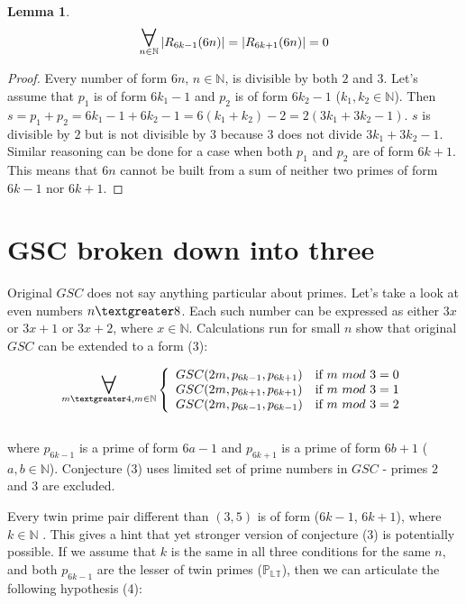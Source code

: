 \documentclass[10pt,twocolumn]{article}
\newtheorem{lemma}[theorem]{Lemma}
\newcommand\bigforall{\mbox{\huge $\mathsurround0pt\forall$}}
\begin{document}
\begin{lemma}
\begin{equation}
\displaystyle\mathop{\bigforall}_{n \in \mathbb{N}}
\left\vert R_{6k - 1}(6n) \right\vert = \left\vert R_{6k + 1}(6n) \right\vert = 0
\end{equation}
\end{lemma}
\begin{proof}
Every number of form $6n$, $n \in \mathbb{N}$, is divisible by both $2$ and $3$. Let's assume that $p_1$ is of form $6k_1-1$ and $p_2$ is of form $6k_2-1$ ($k_1, k_2 \in \mathbb{N}$). Then $s = p_1 + p_2 = 6k_1 - 1 + 6k_2 - 1 = 6(k_1 + k_2) - 2 = 2(3k_1 + 3k_2 - 1)$. $s$ is divisible by $2$ but is not divisible by $3$ because $3$ does not divide $3k_1 + 3k_2 - 1$. Similar reasoning can be done for a case when both $p_1$ and $p_2$ are of form $6k+1$. This means that $6n$ cannot be built from a sum of neither two primes of form $6k-1$ nor $6k+1$.
\end{proof}

\section{GSC broken down into three}

Original $GSC$ does not say anything particular about primes. Let's take a look at even numbers $n \textgreater 8$. Each such number can be expressed as either $3x$ or $3x+1$ or $3x+2$, where $x \in \mathbb{N}$. Calculations run for small $n$  show that original $GSC$ can be extended to a form (3):

\begin{equation}
\displaystyle\mathop{\bigforall}_{m \textgreater 4, m \in \mathbb{N}}
\left\{ \begin{array}{ll}
GSC(2m, p_{6k-1}, p_{6k+1}) & \textrm{if $m$ $mod$ $3 = 0$}\\
GSC(2m, p_{6k+1}, p_{6k+1}) & \textrm{if $m$ $mod$ $3 = 1$}\\
GSC(2m, p_{6k-1}, p_{6k-1}) & \textrm{if $m$ $mod$ $3 = 2$}\\
\end{array} \right.
\end{equation}
\\where 
$p_{6k-1}$ is a prime of form ${6a-1}$ \cite{A007528} and $p_{6k+1}$ is a prime of form  ${6b+1}$ \cite{A002476} ($a, b \in \mathbb{N}$). Conjecture (3) uses limited set of prime numbers in $GSC$ - primes $2$ and $3$ are excluded.\par
Every twin prime pair different than $(3, 5)$ is of form ($6k - 1$, $6k + 1$), where $k \in \mathbb{N}$ \cite{barylski2018}. This gives a hint that yet stronger version of conjecture (3) is potentially possible. If we assume that $k$ is the same in all three conditions for the same $n$, and both $p_{6k-1}$ are the lesser of twin primes ($\mathbb{P_{LT}}$), then we can articulate the following  hypothesis (4):
\end{document}
